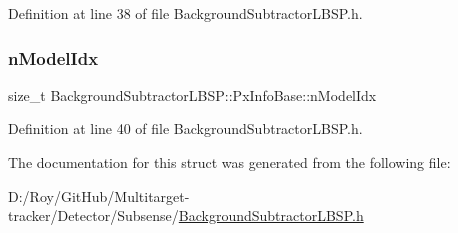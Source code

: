 Definition at line 38 of file Background\+Subtractor\+L\+B\+S\+P.\+h.

\mbox{\label{struct_background_subtractor_l_b_s_p_1_1_px_info_base_afe4a63a708fa0f3ea6ed2fac837bc71d}} 
\subsubsection{\texorpdfstring{n\+Model\+Idx}{nModelIdx}}
{\footnotesize\ttfamily size\+\_\+t Background\+Subtractor\+L\+B\+S\+P\+::\+Px\+Info\+Base\+::n\+Model\+Idx}



Definition at line 40 of file Background\+Subtractor\+L\+B\+S\+P.\+h.



The documentation for this struct was generated from the following file\+:\begin{DoxyCompactItemize}
\item 
D\+:/\+Roy/\+Git\+Hub/\+Multitarget-\/tracker/\+Detector/\+Subsense/\mbox{\hyperlink{_background_subtractor_l_b_s_p_8h}{Background\+Subtractor\+L\+B\+S\+P.\+h}}\end{DoxyCompactItemize}
